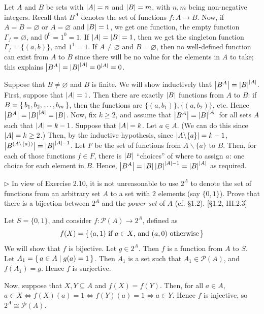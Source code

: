 \begin{solution}
	Let $A$ and $B$ be sets with $\left|A\right|=n$ and $\left|B\right|=m$, with $n,m$ being
	non-negative integers. Recall that $B^A$ denotes the set of functions $f:A\to
	B$. Now, if $A=B=\varnothing$ or $A=\varnothing$ and $\left|B\right|=1$, we get one
	function, the empty function $\Gamma_f = \varnothing$, and $0^0 = 1^0 = 1$. If
	$\left|A\right| = \left|B\right| = 1$, then we get the singleton function
	$\Gamma_f=\{(a,b)\}$, and $1^1 = 1$. If $A\neq\varnothing$ and $B=\varnothing$, then
	no well-defined function can exist from $A$ to $B$ since there will be no value
	for the elements in $A$ to take; this explains $\left|B^A\right| = \left|B\right|^{\left|A\right|} =
	0^{\left|A\right|} = 0$.
	
	Suppose that $B\neq\varnothing$ and $B$ is finite. We will show inductively that
	$\left|B^A\right| = \left|B\right|^{\left|A\right|}$. First, suppose that $\left|A\right| = 1$.  Then there
	are exactly $\left|B\right|$ functions from $A$ to $B$: if $B=\left\{\,b_1,b_2,\dots,b_m\,\right\}$,
	then the functions are $\{(a,b_1)\}, \{(a,b_2)\}$, etc. Hence $\left|B^A\right| =
	\left|B\right|^{\left|A\right|} = \left|B\right|$.  Now, fix $k\geq 2$, and assume that $\left|B^A\right| =
	\left|B\right|^{\left|A\right|}$ for all sets $A$ such that $\left|A\right|=k-1$. Suppose that
	$\left|A\right|=k$. Let $a\in A$. (We can do this since $\left|A\right|=k\geq 2$.) Then, by
	the inductive hypothesis, since $\left|A\backslash\{a\}\right|=k-1$,
	$\left|B^{(A\backslash\{a\})}\right| = \left|B\right|^{\left|A\right|-1}$. Let $F$ be the set of
	functions from $A\backslash\{a\}$ to $B$.  Then, for each of those functions
	$f\in F$, there is $\left|B\right|$ ``choices'' of where to assign $a$: one choice for
	each element in $B$. Hence, $\left|B^A\right| = \left|B\right|\left|B\right|^{\left|A\right|-1} =
	\left|B\right|^{\left|A\right|}$ as required.
\end{solution}


\begin{problem}[2.11]
	$\rhd$ In view of Exercise 2.10, it is not unreasonable to use $2^A$ to denote
	the set of functions from an arbitrary set $A$ to a set with $2$ elements (say
	$\{0,1\}$). Prove that there is a bijection between $2^A$ and the \textit{power
		set} of $A$ (cf. \S1.2). [\S1.2, III.2.3]
\end{problem}

\begin{solution}
	Let $S = \{0,1\}$, and consider $f:\mathcal{P}(A)\to 2^A$, defined as
	\[ f(X) = \left\{\,(a,1) \text{ if $a\in X$, and }(a,0) \text{ otherwise}\,\right\} \]
	We will show that $f$ is bijective. Let $g\in 2^A$. Then $f$ is a
	function from $A$ to $S$. Let $A_1 = \left\{\,a\in A\mid g(a) = 1\,\right\}$. Then $A_1$ is a
	set such that $A_1\in\mathcal{P}(A)$, and $f(A_1)=g$. Hence $f$ is surjective.
	
	Now, suppose that $X,Y\subseteq A$ and $f(X) = f(Y)$. Then, for all $a\in A$,
	$a\in X \iff f(X)(a) = 1 \iff f(Y)(a) = 1 \iff a\in Y$. Hence $f$ is injective,
	so $2^A\cong\mathcal{P}(A)$.
\end{solution}

